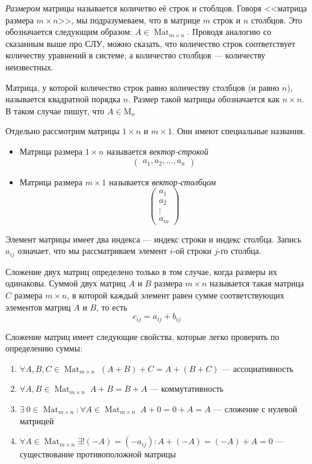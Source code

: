\documentclass[a4paper, 12pt]{article}
\DeclareMathOperator{\Mat}{Mat}
\begin{document}
\textit{Размером} матрицы называется количетво её строк и стоблцов. Говоря <<матрица размера $m \times n$>>, мы подразумеваем, что в матрице $m$ строк и $n$ столбцов. Это обозначается следующим образом: $A \in \Mat_{m \times n}$. Проводя аналогию со сказанным выше про СЛУ, можно сказать, что количество строк соответствует количеству уравнений в системе, а количество столбцов --- количеству неизвестных.

Матрица, у которой количество строк равно количеству столбцов (и равно $n$), называется квадратной порядка $n$.
Размер такой матрицы обозначается как $n \times n$. В таком случае пишут, что $A \in \mathrm{M}_n$

Отдельно рассмотрим матрицы $1 \times n$ и $m \times 1$. Они имеют специальные названия.
\begin{itemize}
\item Матрица размера $1 \times n$ называется \textit{вектор-строкой}
\[\begin{pmatrix}
a_1, a_2, \ldots ,a_n
\end{pmatrix}\]
\item Матрица размера $m \times 1$ называется \textit{вектор-столбцом}
\[\begin{pmatrix}
a_1 \\ a_2 \\ \vdots \\ a_m
\end{pmatrix}\]
\end{itemize}

Элемент матрицы имеет два индекса --- индекс строки и индекс столбца. Запись $a_{ij}$ означает, что мы рассматриваем элемент $i$-ой строки $j$-го столбца.

$\textit{Сложение}$ двух матриц определено только в том случае, когда размеры их одинаковы. $\textit{Суммой}$ двух матриц $A$ и $B$ размера $m \times n$ называется такая матрица $C$ размера $m \times n$, в которой каждый элемент равен сумме соответствующих элементов матриц $A$ и $B$, то есть
\[c_{ij} = a_{ij} + b_{ij}\]

Сложение матриц имеет следующие свойства, которые легко проверить по определению суммы:
\begin{enumerate}
\item $\forall A, B, C \in \Mat_{m \times n}\; (A + B) + C = A + (B + C)$ --- ассоциативность
\item $\forall A, B \in \Mat_{m \times n}\; A + B  = B + A$ --- коммутативность
\item $\exists\ 0 \in \Mat_{m \times n} : \forall A \in \Mat_{m \times n}\; A + 0 = 0 + A = A$ --- сложение с нулевой матрицей
\item $\forall A \in \Mat_{m \times n} \exists!(-A) = (-a_{ij}) : A + (-A) = (-A) + A = 0$ --- существование противоположной матрицы 
\end{enumerate}
\end{document}

